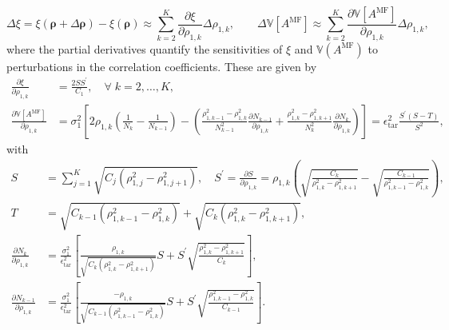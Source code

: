 %
\[
\Delta\xi=\xi(\boldsymbol{\rho}+\Delta \boldsymbol{\rho}) - \xi(\boldsymbol{\rho}) \approx \sum_{k=2}^K \frac{\partial \xi}{\partial \rho_{1,k}} \Delta\rho_{1,k},\quad \quad \Delta \mathbb{V}\left[A^{\text{MF}}\right]\approx \sum_{k=2}^K \frac{\partial  \mathbb{V}\left[A^{\text{MF}}\right]}{\partial  \rho_{1,k}}  \Delta\rho_{1,k},
\]
%
where the partial derivatives quantify the sensitivities of $\xi$ and $\mathbb{V}(A^{\text{MF}})$ to perturbations in the correlation coefficients. These are given by
%
\begin{align}
\label{eq:partial_xi_rho}
\frac{\partial  \xi}{\partial  \rho_{1,k}} 
&=\frac{2SS^\prime}{C_1}, \quad \forall\; k=2,\ldots, K,\\
\label{eq:partial_var_rho}
\frac{\partial  \mathbb{V}\left[A^{\text{MF}}\right]}{\partial  \rho_{1,k}} 
&=\sigma_1^2\left[2\rho_{1,k}\left(\frac{1}{N_{k}} - \frac{1}{N_{k-1}}\right)-\left( \frac{\rho_{1,k-1}^2 -\rho_{1,k}^2 }{N_{k-1}^2}\frac{\partial N_{k-1}}{\partial  \rho_{1,k}}+\frac{\rho_{1,k}^2 -\rho_{1,k+1}^2 }{N_k^2}\frac{\partial N_k}{\partial  \rho_{1,k}}\right)\right]=\epsilon_{\text{tar}}^2\frac{S^\prime \left(S-T\right)}{S^2},
\end{align}
%
with
%
\begin{align}
\label{eq:S_n_S_prime}
S& = \sum_{j=1}^K\sqrt{C_j\left(\rho_{1,j}^2-\rho_{1,j+1}^2\right)},\quad
S^\prime = \frac{\partial  S}{\partial  \rho_{1,k}} = \rho_{1,k}\left(\sqrt{\frac{C_k}{\rho_{1,k}^2-\rho_{1,k+1}^2}} - \sqrt{\frac{C_{k-1}}{\rho_{1,k-1}^2-\rho_{1,k}^2}}\right),\\
\nonumber
T &=  \sqrt{C_{k-1}\left(\rho_{1,k-1}^2 - \rho_{1,k}^2\right)} + \sqrt{C_{k}\left(\rho_{1,k}^2 - \rho_{1,k+1}^2\right)},\\
\nonumber
\frac{\partial N_{k}}{\partial  \rho_{1,k}}&=\frac{\sigma_1^2}{\epsilon_{\text{tar}}^2}\left[\frac{\rho_{1,k}}{\sqrt{C_{k}\left(\rho_{1,k}^2 - \rho_{1,k+1}^2\right)}}S+S^\prime \sqrt{\frac{\rho_{1,k}^2 - \rho_{1,k+1}^2}{C_{k}}}\right],\\
\nonumber
\frac{\partial N_{k-1}}{\partial  \rho_{1,k}}&=\frac{\sigma_1^2}{\epsilon_{\text{tar}}^2}\left[\frac{-\rho_{1,k}}{\sqrt{C_{k-1}\left(\rho_{1,k-1}^2 - \rho_{1,k}^2\right)}}S+S^\prime \sqrt{\frac{\rho_{1,k-1}^2 - \rho_{1,k}^2}{C_{k-1}}}\right].
\end{align}
